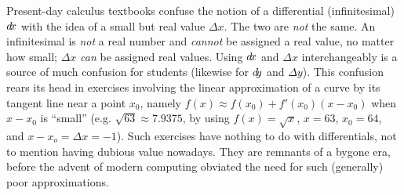 Present-day calculus textbooks confuse the notion of a differential
(infinitesimal) $d\!x$ with the idea of a small but real value $\Delta x$. The
two are \emph{not} the same. An infinitesimal is \emph{not} a real number and
\emph{cannot} be assigned a real value, no matter how small; $\Delta x$
\emph{can} be assigned real values. Using $d\!x$ and $\Delta x$
interchangeably is a source of much confusion for students (likewise for $d\!y$
and $\Delta y$). This confusion rears its head in exercises involving the
linear approximation of a curve by its tangent line near a point $x_0$, namely
$f(x) \approx f(x_0) + f'(x_0)(x - x_0)$ when $x-x_0$ is ``small'' (e.g.
$\sqrt{63} \approx 7.9375$, by using $f(x)=\sqrt{x}$, $x=63$, $x_0=64$, and
$x-x_o = \Delta x = -1$).
Such exercises have nothing to do with differentials, not to mention having
dubious value nowadays. They are remnants of a bygone era, before the advent of
modern computing obviated the need for such (generally) poor
approximations.\\\vspace{2mm}
\divider
\vspace{3mm}

